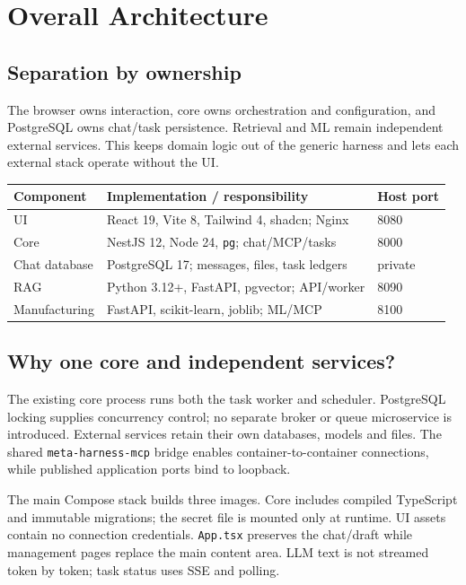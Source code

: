 \chapter{Overall Architecture}
\section{Separation by ownership}
The browser owns interaction, core owns orchestration and configuration, and PostgreSQL owns chat/task persistence. Retrieval and ML remain independent external services. This keeps domain logic out of the generic harness and lets each external stack operate without the UI.
\begin{center}\end{center}
\begin{tabularx}{\linewidth}{@{}lXl@{}}\toprule
Component & Implementation / responsibility & Host port\\\midrule
UI & React 19, Vite 8, Tailwind 4, shadcn; Nginx & 8080\\
Core & NestJS 12, Node 24, \texttt{pg}; chat/MCP/tasks & 8000\\
Chat database & PostgreSQL 17; messages, files, task ledgers & private\\
RAG & Python 3.12+, FastAPI, pgvector; API/worker & 8090\\
Manufacturing & FastAPI, scikit-learn, joblib; ML/MCP & 8100\\\bottomrule
\end{tabularx}
\section{Why one core and independent services?}
The existing core process runs both the task worker and scheduler. PostgreSQL locking supplies concurrency control; no separate broker or queue microservice is introduced. External services retain their own databases, models and files. The shared \texttt{meta-harness-mcp} bridge enables container-to-container connections, while published application ports bind to loopback.

The main Compose stack builds three images. Core includes compiled TypeScript and immutable migrations; the secret file is mounted only at runtime. UI assets contain no connection credentials. \texttt{App.tsx} preserves the chat/draft while management pages replace the main content area. LLM text is not streamed token by token; task status uses SSE and polling.
